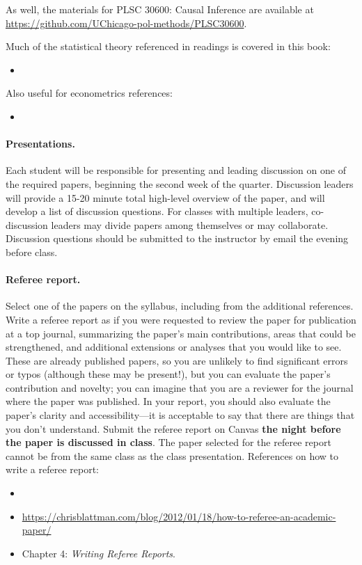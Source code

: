 \documentclass[letterpaper, 12pt, parskip=full,DIV=10]{scrartcl}
\begin{document}
As well, the materials for PLSC 30600: Causal Inference are available at \url{https://github.com/UChicago-pol-methods/PLSC30600}. 

Much of the statistical theory referenced in readings is covered in this book: 
\begin{itemize}
\item {}
\end{itemize}

Also useful for econometrics references:
\begin{itemize}
\item {}
\end{itemize}


\paragraph{Presentations.}
Each student will be responsible for presenting and leading discussion on one of the required papers, beginning the second week of the quarter. 
Discussion leaders will provide a 15-20 minute total high-level overview of the paper, and will develop a list of discussion questions. 
For classes with multiple leaders, co-discussion leaders may divide papers among themselves or may collaborate. 
Discussion questions should be submitted to the instructor by email the evening before class. 

\paragraph{Referee report.}
Select one of the papers on the syllabus, including from the additional references. 
Write a referee report as if you were requested to review the paper for publication at a top journal, summarizing the paper's main contributions, areas that could be strengthened, and additional extensions or analyses that you would like to see. 
These are already published papers, so you are unlikely to find significant errors or typos (although these may be present!), but you can evaluate the paper's contribution and novelty; you can imagine that you are a reviewer for the journal where the paper was published. 
In your report, you should also evaluate the paper's clarity and accessibility---it is acceptable to say that there are things that you don't understand. 
Submit the referee report on Canvas \textbf{the night before the paper is discussed in class}. 
The paper selected for the referee report cannot be from the same class as the class presentation. 
References on how to write a referee report:
\begin{itemize}
\item {}
 \item \url{https://chrisblattman.com/blog/2012/01/18/how-to-referee-an-academic-paper/}
 \item {} Chapter 4: \emph{Writing Referee Reports}. 
 \end{itemize}
\end{document}
